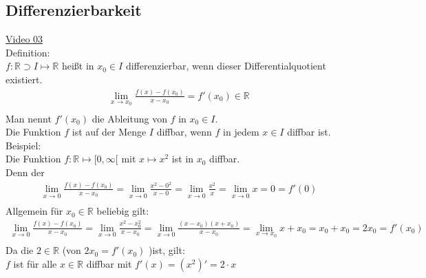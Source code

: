 \subsection{Differenzierbarkeit}
\href{https://youtu.be/RvEYe71qW_w}{Video 03}\\
Definition:\\
$f:\mathbb{R}\supset I\longmapsto\mathbb{R}$ heißt in $ x_0\in I $ differenzierbar, wenn dieser Differentialquotient existiert.\\
\begin{align*}
\lim\limits_ {x\to x_0}\frac{f(x)-f(x_0)}{x-x_0}=f'(x_0)\in \mathbb{R}\\
\end{align*}
Man nennt $ f'(x_0) $ die Ableitung von $ f $ in $ x_0\in I $.\\
Die Funktion $ f $ ist auf der Menge $I$ diffbar, wenn $ f $ in jedem $ x\in I $ diffbar ist.\vspace*{2mm}\\
Beispiel:\\
Die Funktion $ f:\mathbb{R}\longmapsto [0,\infty[ $ mit $ x\longmapsto x^2 $ ist in $ x_0 $ diffbar.\\
Denn der\\
\begin{align*}
\lim\limits_ {x\to 0}\frac{f(x)-f(x_0)}{x-x_0}=\lim\limits_ {x\to 0}\frac{x^2-0^2}{x-0}=\lim\limits_ {x\to 0}\frac{x^2}{x}=\lim\limits_ {x\to 0}x=0=f'(0)\\
\end{align*}
Allgemein für $ x_0\in \mathbb{R} $ beliebig gilt:\\
\begin{align*}
\lim\limits_ {x\to 0}\frac{f(x)-f(x_0)}{x-x_0}=\lim\limits_ {x\to 0}\frac{x^2-x_0^2}{x-x_0}=\lim\limits_ {x\to 0}\frac{(x-x_0)(x+x_0)}{x-x_0}=\lim\limits_ {x\to x_0}x+x_0=x_0+x_0=2x_0=f'(x_0)\\
\end{align*}
Da die $ 2\in \mathbb{R} $ (von $2x_0=f'(x_0)$ )ist, gilt:\\
$ f $ ist für alle $ x\in \mathbb{R} $ diffbar mit $ f' (x)=(x^2)'=2\cdot x$\\
\newpage
\noindent
